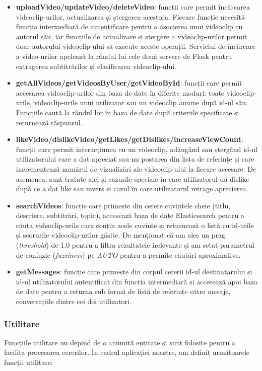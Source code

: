 \begin{itemize}
    \item \textbf{uploadVideo/updateVideo/deleteVideo}: funcții care permit încărcarea videoclip-urilor,
    actualizarea și ștergerea acestora. Fiecare funcție necesită funcția intermediară de autentificare pentru
    a asocierea unui videoclip cu autorul său, iar funcțiile de actualizare și ștergere a videoclip-urilor
    permit doar autorului videoclip-ului să execute aceste operații. Serviciul de încărcare a video-urilor
    apelează la rândul lui cele două servere de Flask pentru extragerea subtitrărilor și clasificarea
    videoclip-ului.
    \item \textbf{getAllVideos/getVideosByUser/getVideoById}: funcții care permit accesarea videoclip-urilor
    din baza de date în diferite moduri: toate videoclip-urile, videoclip-urile unui utilizator sau un
    videoclip anume după id-ul său. Funcțiile caută la rândul lor în baza de date după criteriile
    specificate și returnează răspunsul.
    \item \textbf{likeVideo/dislikeVideo/getLikes/getDislikes/increaseViewCount}: funcții care permit
    interacțiunea cu un videoclip, adăugând sau ștergând id-ul utilizatorului care a dat apreciat sau nu
    postarea din lista de referințe și care incrementează numărul de vizualizări ale videoclip-ului la
    fiecare accesare. De asemenea, sunt tratate aici și cazurile speciale în care utilizatorul
    dă dislike după ce a dat like sau invers și cazul în care utilizatorul retrage aprecierea.
    \item \textbf{searchVideos}: funcție care primește din cerere cuvintele cheie (titlu, descriere,
    subtitrări, topic), accesează baza de date Elasticsearch pentru a căuta videoclip-urile care conțin
    acele cuvinte și returnează o listă cu id-urile și scorurile videoclip-urilor găsite. De menționat
    că am ales un prag (\textit{threshold}) de 1.0 pentru a filtra rezultatele irelevante și am setat
    parametrul de confuzie (\textit{fuzziness}) pe \textit{AUTO} pentru a permite căutări aproximative.
    \item \textbf{getMessages}: funcție care primește din corpul cererii id-ul destinatarului și id-ul
    utilizatorului autentificat din funcția intermediară și accesează apoi baza de date pentru a returna
    sub formă de listă de referințe către mesaje, conversațiile dintre cei doi utilizatori.
\end{itemize}

\subsubsection{Utilitare}
Funcțiile utilitare nu depind de o anumită entitate și sunt folosite pentru a facilita procesarea
cererilor. În cadrul aplicației noastre, am definit următoarele funcții utilitare:

